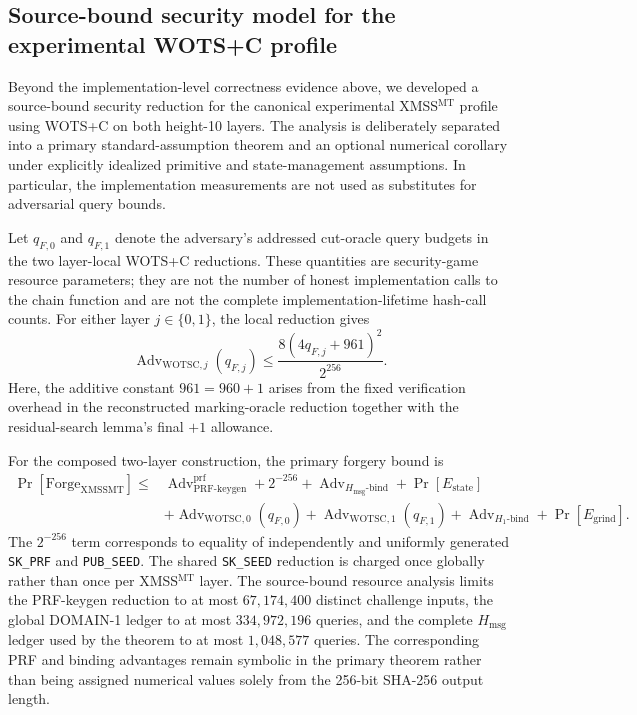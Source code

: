 
\subsection{Source-bound security model for the experimental WOTS+C profile}
\label{subsec:wotsc_security_model}

Beyond the implementation-level correctness evidence above, we developed a
source-bound security reduction for the canonical experimental
XMSS$^{\mathrm{MT}}$ profile using WOTS+C on both height-10 layers. The
analysis is deliberately separated into a primary standard-assumption theorem
and an optional numerical corollary under explicitly idealized primitive and
state-management assumptions. In particular, the implementation measurements
are not used as substitutes for adversarial query bounds.

Let $q_{F,0}$ and $q_{F,1}$ denote the adversary's addressed cut-oracle query
budgets in the two layer-local WOTS+C reductions. These quantities are
security-game resource parameters; they are not the number of honest
implementation calls to the chain function and are not the complete
implementation-lifetime hash-call counts. For either layer $j\in\{0,1\}$,
the local reduction gives
\[
  \operatorname{Adv}_{\mathrm{WOTSC},j}(q_{F,j})
  \le
  \frac{8(4q_{F,j}+961)^2}{2^{256}}.
\]
Here, the additive constant $961=960+1$ arises from the fixed verification
overhead in the reconstructed marking-oracle reduction together with the
residual-search lemma's final $+1$ allowance.

For the composed two-layer construction, the primary forgery bound is
\[
\begin{aligned}
\Pr[\mathrm{Forge}_{\mathrm{XMSSMT}}]
\le{}&
  \operatorname{Adv}^{\mathrm{prf}}_{\mathrm{PRF\mbox{-}keygen}}
  + 2^{-256}
  + \operatorname{Adv}_{H_{\mathrm{msg}}\text{-}\mathrm{bind}}
  + \Pr[E_{\mathrm{state}}] \\
 &+
  \operatorname{Adv}_{\mathrm{WOTSC},0}(q_{F,0})
  + \operatorname{Adv}_{\mathrm{WOTSC},1}(q_{F,1})
  + \operatorname{Adv}_{H_1\text{-}\mathrm{bind}}
  + \Pr[E_{\mathrm{grind}}].
\end{aligned}
\]
The $2^{-256}$ term corresponds to equality of independently and uniformly
generated \texttt{SK\_PRF} and \texttt{PUB\_SEED}. The shared
\texttt{SK\_SEED} reduction is charged once globally rather than once per
XMSS$^{\mathrm{MT}}$ layer. The source-bound resource analysis limits the
PRF-keygen reduction to at most $67{,}174{,}400$ distinct challenge inputs,
the global DOMAIN-1 ledger to at most $334{,}972{,}196$ queries, and the
complete $H_{\mathrm{msg}}$ ledger used by the theorem to at most
$1{,}048{,}577$ queries. The corresponding PRF and binding advantages remain
symbolic in the primary theorem rather than being assigned numerical values
solely from the 256-bit SHA-256 output length.

